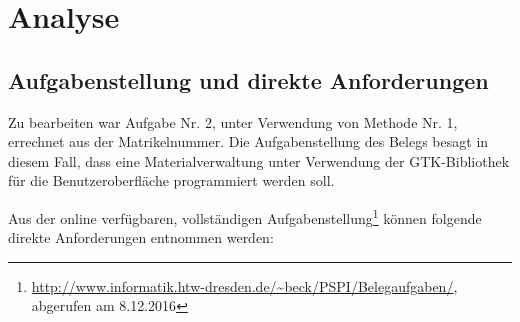 \section{Analyse}
\subsection{Aufgabenstellung und direkte Anforderungen}
\label{aufgabenstellung}
Zu bearbeiten war Aufgabe Nr. 2, unter Verwendung von Methode Nr. 1, errechnet aus der Matrikelnummer.
Die Aufgabenstellung des Belegs besagt in diesem Fall, dass eine Materialverwaltung unter Verwendung der GTK-Bibliothek
für die Benutzeroberfläche programmiert werden soll.

\bigskip

\noindent
Aus der online verfügbaren, vollständigen Aufgabenstellung\footnote{\url{http://www.informatik.htw-dresden.de/~beck/PSPI/Belegaufgaben/},
abgerufen am 8.12.2016} können folgende direkte Anforderungen entnommen werden:


